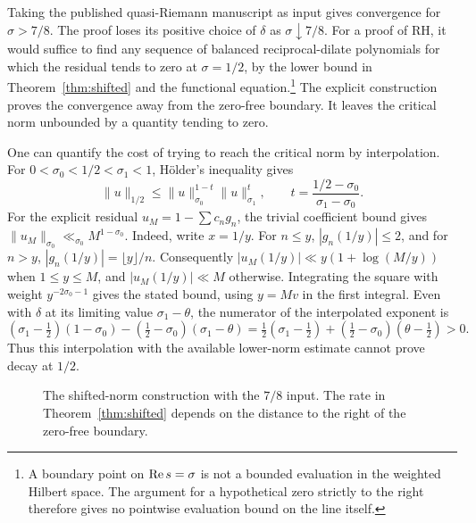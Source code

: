 Taking the published quasi-Riemann manuscript as input gives convergence for \(\sigma>7/8\). The proof loses its positive choice of \(\delta\) as \(\sigma\downarrow7/8\). For a proof of RH, it would suffice to find any sequence of balanced reciprocal-dilate polynomials for which the residual tends to zero at \(\sigma=1/2\), by the lower bound in Theorem~\ref{thm:shifted} and the functional equation.\footnote{A boundary point on \(\operatorname{Re} s=\sigma\) is not a bounded evaluation in the weighted Hilbert space. The argument for a hypothetical zero strictly to the right therefore gives no pointwise evaluation bound on the line itself.} The explicit construction proves the convergence away from the zero-free boundary. It leaves the critical norm unbounded by a quantity tending to zero.

One can quantify the cost of trying to reach the critical norm by interpolation. For \(0<\sigma_0<1/2<\sigma_1<1\), H\"older's inequality gives
\[
 \|u\|_{1/2}\le \|u\|_{\sigma_0}^{1-t}\|u\|_{\sigma_1}^{t},
 \qquad t=\frac{1/2-\sigma_0}{\sigma_1-\sigma_0}.
\]
For the explicit residual \(u_M=1-\sum c_ng_n\), the trivial coefficient bound gives \(\|u_M\|_{\sigma_0}\ll_{\sigma_0}M^{1-\sigma_0}\). Indeed, write \(x=1/y\). For \(n\le y\), \(|g_n(1/y)|\le 2\), and for \(n>y\), \(|g_n(1/y)|=\lfloor y\rfloor/n\). Consequently \(|u_M(1/y)|\ll y(1+\log(M/y))\) when \(1\le y\le M\), and \(|u_M(1/y)|\ll M\) otherwise. Integrating the square with weight \(y^{-2\sigma_0-1}\) gives the stated bound, using \(y=Mv\) in the first integral. Even with \(\delta\) at its limiting value \(\sigma_1-\theta\), the numerator of the interpolated exponent is
\[
 (\sigma_1-\tfrac12)(1-\sigma_0)
  -(\tfrac12-\sigma_0)(\sigma_1-\theta)
 =\tfrac12(\sigma_1-\tfrac12)+(\tfrac12-\sigma_0)(\theta-\tfrac12)>0 .
\]
Thus this interpolation with the available lower-norm estimate cannot prove decay at \(1/2\).

\begin{figure}[ht]
\centering
{}
\caption{The shifted-norm construction with the \(7/8\) input. The rate in Theorem~\ref{thm:shifted} depends on the distance to the right of the zero-free boundary.}
\label{fig:strip}
\end{figure}

